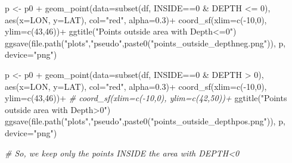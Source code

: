 \documentclass[
]{book}
\newenvironment{Shaded}{\begin{snugshade}}{\end{snugshade}}
\newcommand{\AttributeTok}[1]{\textcolor[rgb]{0.77,0.63,0.00}{#1}}
\newcommand{\CommentTok}[1]{\textcolor[rgb]{0.56,0.35,0.01}{\textit{#1}}}
\newcommand{\DecValTok}[1]{\textcolor[rgb]{0.00,0.00,0.81}{#1}}
\newcommand{\FloatTok}[1]{\textcolor[rgb]{0.00,0.00,0.81}{#1}}
\newcommand{\FunctionTok}[1]{\textcolor[rgb]{0.00,0.00,0.00}{#1}}
\newcommand{\NormalTok}[1]{#1}
\newcommand{\OtherTok}[1]{\textcolor[rgb]{0.56,0.35,0.01}{#1}}
\newcommand{\SpecialCharTok}[1]{\textcolor[rgb]{0.00,0.00,0.00}{#1}}
\newcommand{\StringTok}[1]{\textcolor[rgb]{0.31,0.60,0.02}{#1}}
\begin{document}
\begin{Shaded}
\begin{Highlighting}[]
\NormalTok{p }\OtherTok{\textless{}{-}}\NormalTok{ p0 }\SpecialCharTok{+}
  \FunctionTok{geom\_point}\NormalTok{(}\AttributeTok{data=}\FunctionTok{subset}\NormalTok{(df, INSIDE}\SpecialCharTok{==}\DecValTok{0} \SpecialCharTok{\&}\NormalTok{ DEPTH }\SpecialCharTok{\textless{}=} \DecValTok{0}\NormalTok{), }\FunctionTok{aes}\NormalTok{(}\AttributeTok{x=}\NormalTok{LON, }\AttributeTok{y=}\NormalTok{LAT), }\AttributeTok{col=}\StringTok{"red"}\NormalTok{, }\AttributeTok{alpha=}\FloatTok{0.3}\NormalTok{)}\SpecialCharTok{+}
  \FunctionTok{coord\_sf}\NormalTok{(}\AttributeTok{xlim=}\FunctionTok{c}\NormalTok{(}\SpecialCharTok{{-}}\DecValTok{10}\NormalTok{,}\DecValTok{0}\NormalTok{), }\AttributeTok{ylim=}\FunctionTok{c}\NormalTok{(}\DecValTok{43}\NormalTok{,}\DecValTok{46}\NormalTok{))}\SpecialCharTok{+}
  \FunctionTok{ggtitle}\NormalTok{(}\StringTok{"Points outside area with Depth\textless{}=0"}\NormalTok{)}
  \FunctionTok{ggsave}\NormalTok{(}\FunctionTok{file.path}\NormalTok{(}\StringTok{"plots"}\NormalTok{,}\StringTok{"pseudo"}\NormalTok{,}\FunctionTok{paste0}\NormalTok{(}\StringTok{"points\_outside\_depthneg.png"}\NormalTok{)), p, }\AttributeTok{device=}\StringTok{"png"}\NormalTok{)}

\NormalTok{p }\OtherTok{\textless{}{-}}\NormalTok{ p0 }\SpecialCharTok{+}
  \FunctionTok{geom\_point}\NormalTok{(}\AttributeTok{data=}\FunctionTok{subset}\NormalTok{(df, INSIDE}\SpecialCharTok{==}\DecValTok{0} \SpecialCharTok{\&}\NormalTok{ DEPTH }\SpecialCharTok{\textgreater{}} \DecValTok{0}\NormalTok{), }\FunctionTok{aes}\NormalTok{(}\AttributeTok{x=}\NormalTok{LON, }\AttributeTok{y=}\NormalTok{LAT), }\AttributeTok{col=}\StringTok{"red"}\NormalTok{, }\AttributeTok{alpha=}\FloatTok{0.3}\NormalTok{)}\SpecialCharTok{+}
  \FunctionTok{coord\_sf}\NormalTok{(}\AttributeTok{xlim=}\FunctionTok{c}\NormalTok{(}\SpecialCharTok{{-}}\DecValTok{10}\NormalTok{,}\DecValTok{0}\NormalTok{), }\AttributeTok{ylim=}\FunctionTok{c}\NormalTok{(}\DecValTok{43}\NormalTok{,}\DecValTok{46}\NormalTok{))}\SpecialCharTok{+}
\CommentTok{\#  coord\_sf(xlim=c({-}10,0), ylim=c(42,50))+}
  \FunctionTok{ggtitle}\NormalTok{(}\StringTok{"Points outside area with Depth\textgreater{}0"}\NormalTok{)}
  \FunctionTok{ggsave}\NormalTok{(}\FunctionTok{file.path}\NormalTok{(}\StringTok{"plots"}\NormalTok{,}\StringTok{"pseudo"}\NormalTok{,}\FunctionTok{paste0}\NormalTok{(}\StringTok{"points\_outside\_depthpos.png"}\NormalTok{)), p, }\AttributeTok{device=}\StringTok{"png"}\NormalTok{)}

\CommentTok{\# So, we keep only the points INSIDE the area with DEPTH\textless{}0}


\end{Highlighting}
\end{Shaded}
\end{document}

